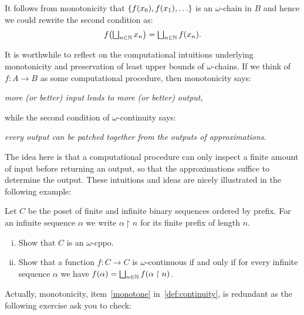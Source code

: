 \begin{remark}
  It follows from monotonicity that \(\set{f(x_0),f(x_1),\dots}\) is an
  \(\omega\)-chain in \(B\) and hence we could rewrite the second condition as:
  \[
    f\pa*{\textstyle\bigsqcup_{n \in \Nat}x_n} = \textstyle\bigsqcup_{n \in
      \Nat}f(x_n).
  \]
\end{remark}

It is worthwhile to reflect on the computational intuitions underlying
monotonicity and preservation of least upper bounds of \(\omega\)-chains.
%
If we think of \(f \colon A \to B\) as some computational procedure, then
monotonicity says:
\begin{displayquote}
  \emph{more (or better) input leads to more (or better) output},
\end{displayquote}
while the second condition of \(\omega\)-continuity says:
\begin{displayquote}
  \emph{every output can be patched together from the outputs of approximations}.
\end{displayquote}
The idea here is that a computational procedure can only inspect a finite amount
of input before returning an output, so that the approximations suffice to
determine the output.
%
These intuitions and ideas are nicely illustrated in the following example:
\begin{exercise}\label{exer:cantor-domain}
  Let \(C\) be the poset of finite and infinite binary sequences ordered by
  prefix. For an infinite sequence \(\alpha\) we write
  \(\alpha \upharpoonright n\) for its finite prefix of length \(n\).

  \begin{enumerate}[(i)]
  \item Show that \(C\) is an \(\omega\)-cppo.
  \item Show that a function \(f \colon C \to C\) is \(\omega\)-continuous if
    and only if for every infinite sequence \(\alpha\) we have
    \(f(\alpha) = \textstyle\bigsqcup_{n \in \mathbb N}f(\alpha \upharpoonright n)\).
  \end{enumerate}
\end{exercise}


Actually, monotonicity, item~\ref{monotone} in~\cref{def:continuity}, is
redundant as the following exercise ask you to check:

